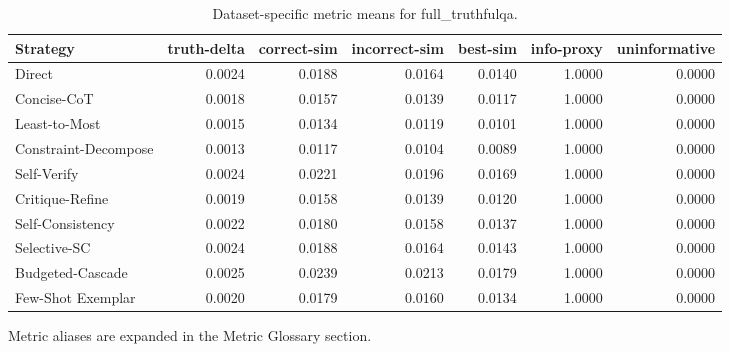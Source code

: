 \documentclass[10pt,twocolumn]{article}
\begin{document}
\begin{table}[t]
\centering
\caption{Dataset-specific metric means for full\_truthfulqa.}
\label{tab:full_truthfulqa_dataset}
\begin{adjustbox}{max width=\textwidth}
\begin{tabular}{lrrrrrr}
\toprule
Strategy & truth-delta & correct-sim & incorrect-sim & best-sim & info-proxy & uninformative \\
\midrule
Direct & 0.0024 & 0.0188 & 0.0164 & 0.0140 & 1.0000 & 0.0000 \\
Concise-CoT & 0.0018 & 0.0157 & 0.0139 & 0.0117 & 1.0000 & 0.0000 \\
Least-to-Most & 0.0015 & 0.0134 & 0.0119 & 0.0101 & 1.0000 & 0.0000 \\
Constraint-Decompose & 0.0013 & 0.0117 & 0.0104 & 0.0089 & 1.0000 & 0.0000 \\
Self-Verify & 0.0024 & 0.0221 & 0.0196 & 0.0169 & 1.0000 & 0.0000 \\
Critique-Refine & 0.0019 & 0.0158 & 0.0139 & 0.0120 & 1.0000 & 0.0000 \\
Self-Consistency & 0.0022 & 0.0180 & 0.0158 & 0.0137 & 1.0000 & 0.0000 \\
Selective-SC & 0.0024 & 0.0188 & 0.0164 & 0.0143 & 1.0000 & 0.0000 \\
Budgeted-Cascade & 0.0025 & 0.0239 & 0.0213 & 0.0179 & 1.0000 & 0.0000 \\
Few-Shot Exemplar & 0.0020 & 0.0179 & 0.0160 & 0.0134 & 1.0000 & 0.0000 \\
\bottomrule
\end{tabular}
\end{adjustbox}
\vspace{2pt}\parbox{0.98\textwidth}{\footnotesize Metric aliases are expanded in the Metric Glossary section.}
\end{table}
\end{document}
